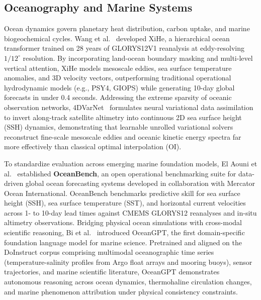 \subsection{Oceanography and Marine Systems}
Ocean dynamics govern planetary heat distribution, carbon uptake, and marine biogeochemical cycles. Wang et al.~\cite{wang2024xihe} developed XiHe, a hierarchical ocean transformer trained on 28 years of GLORYS12V1 reanalysis at eddy-resolving $1/12^\circ$ resolution. By incorporating land-ocean boundary masking and multi-level vertical attention, XiHe models mesoscale eddies, sea surface temperature anomalies, and 3D velocity vectors, outperforming traditional operational hydrodynamic models (e.g., PSY4, GIOPS) while generating 10-day global forecasts in under 0.4 seconds. Addressing the extreme sparsity of oceanic observation networks, 4DVarNet~\cite{fablet2021learning} formulates neural variational data assimilation to invert along-track satellite altimetry into continuous 2D sea surface height (SSH) dynamics, demonstrating that learnable unrolled variational solvers reconstruct fine-scale mesoscale eddies and oceanic kinetic energy spectra far more effectively than classical optimal interpolation (OI).

To standardize evaluation across emerging marine foundation models, El Aouni et al.~\cite{elaouni2025oceanbench} established \textbf{OceanBench}, an open operational benchmarking suite for data-driven global ocean forecasting systems developed in collaboration with Mercator Ocean International. OceanBench benchmarks predictive skill for sea surface height (SSH), sea surface temperature (SST), and horizontal current velocities across 1- to 10-day lead times against CMEMS GLORYS12 reanalyses and in-situ altimetry observations. Bridging physical ocean simulations with cross-modal scientific reasoning, Bi et al.~\cite{bi2024oceangpt} introduced OceanGPT, the first domain-specific foundation language model for marine science. Pretrained and aligned on the DoInstruct corpus comprising multimodal oceanographic time series (temperature-salinity profiles from Argo float arrays and mooring buoys), sensor trajectories, and marine scientific literature, OceanGPT demonstrates autonomous reasoning across ocean dynamics, thermohaline circulation changes, and marine phenomenon attribution under physical consistency constraints.

